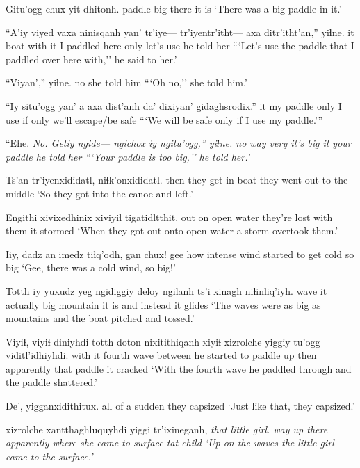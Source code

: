 \documentclass[12pt]{article}
\begin{document}
\gll Gitu'ogg chux yit dhitonh. 
paddle big there {it is}
\glt `There was a big paddle in it.' 
\glend

\gll ``A'iy viyed vaxa ninisqanh yan' tr'iye--- tr'iyentr'itht--- {axa ditr'itht'an},'' yiɬne. 
it boat {with it} {I paddled here} only  {} {} {let's use} {he told her}
\glt ```Let's use the paddle that I paddled over here with,'' he said to her.' 
\glend

\gll ``Viyan','' yiɬne. 
no  {she told him}
\glt ```Oh no,'' she told him.' 
\glend

\gll ``Iy situ'ogg yan' a {axa dist'anh} da' dixiyan' {gidaghsrodix}.''
it {my paddle} only {} {I use} if only {we'll escape/be safe}
\glt ```We will be safe only if I use my paddle.''' 
\glend

\gll ``Ehe. \em No. Getiy ngide--- ngichox iy ngitu'ogg,'' yiɬne. 
{no way}	 {}  very {} {it's big} it {your paddle} {he told her}
\glt ```Your paddle is too big,'' he told her.' 
\glend

\gll Ts'an tr'iyenxididatl, niɬk'onxididatl.
then {they get in boat} {they went out to the middle}
\glt `So they got into the canoe and left.' 
\glend

\gll Engithi xivixedhinix xiviyiɬ tigatidltthit. 
{out on open water} {they're lost} {with them} {it stormed}
\glt `When they got out onto open water a storm overtook them.' 
\glend

\gll Iiy, dadz an imedz tiɬq'odh, gan chux!
gee how {} intense {wind started to get cold} so big
\glt `Gee, there was a cold wind, so big!' 
\glend

\gll Totth iy {yuxudz yeg} ngidiggiy deloy ngilanh ts'i xinagh niɬinliq'iyh. 
wave it actually big mountain {it is} and {instead} {it glides}
\glt `The waves were as big as mountains and the boat pitched and tossed.' 
\glend

\gll Viyiɬ, viyiɬ diniyhdi totth doton nixitithiqanh xiyiɬ xizrolche yiggiy tu'ogg viditl'idhiyhdi. 
{with it} {} {fourth} wave {between} {he started to paddle up} then apparently that paddle {it cracked}
\glt `With the fourth wave he paddled through and the paddle shattered.' 
\glend

\gll De', yigganxidithitux.
{{all of a sudden}} {they capsized}
\glt `Just like that, they capsized.' 
\glend

 xizrolche xantthaghluquyhdi yiggi tr'ixineganh, \em {that little girl. }
{way up there} apparently {where she came to surface} tat child
\glt `Up on the waves the little girl came to the surface.' 
\glend
\end{document}

